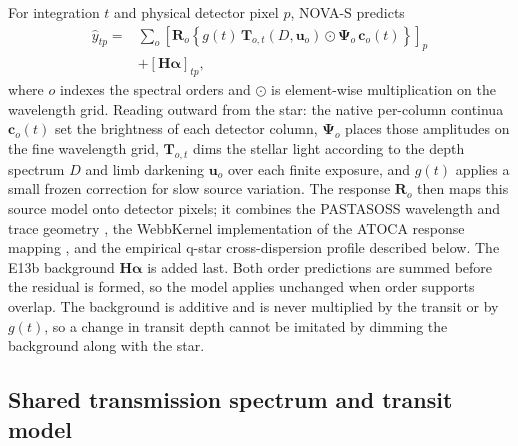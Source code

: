 For integration $t$ and physical detector pixel $p$, NOVA-S predicts
\begin{equation}
\begin{split}
 \widehat y_{tp}
 = {}& \sum_o \left[\bm{R}_o\left\{
   g(t)\,\bm{T}_{o,t}(D,\bm{u}_o)\odot
   \bm{\Psi}_o\,\bm{c}_o(t)\right\}\right]_p \\
 & + \left[\bm{H}\bm{\alpha}\right]_{tp} ,
\end{split}
 \label{eq:nova-forward}
\end{equation}
where $o$ indexes the spectral orders and $\odot$ is element-wise
multiplication on the wavelength grid. Reading outward from the star: the
native per-column continua $\bm{c}_o(t)$ set the brightness of each
detector column, $\bm{\Psi}_o$ places those amplitudes on the fine
wavelength grid, $\bm{T}_{o,t}$ dims the stellar light according to the
depth spectrum $D$ and limb darkening $\bm{u}_o$ over each finite exposure,
and $g(t)$ applies a small frozen correction for slow source variation.
The response $\bm{R}_o$ then maps this source model onto detector pixels;
it combines the PASTASOSS wavelength and trace geometry
\citep{BainesEtAl2023Trace,BainesEtAl2023Wavelength}, the WebbKernel
implementation of the ATOCA response mapping
\citep{DarveauBernierEtAl2022,JWSTPipeline2025}, and the empirical q-star
cross-dispersion profile described below. The E13b background
$\bm{H}\bm{\alpha}$ is added last. Both order predictions are summed before
the residual is formed, so the model applies unchanged when order supports
overlap. The background is additive and is never multiplied
by the transit or by $g(t)$, so a change in transit depth cannot be
imitated by dimming the background along with the star.

\subsection{Shared transmission spectrum and transit model}


